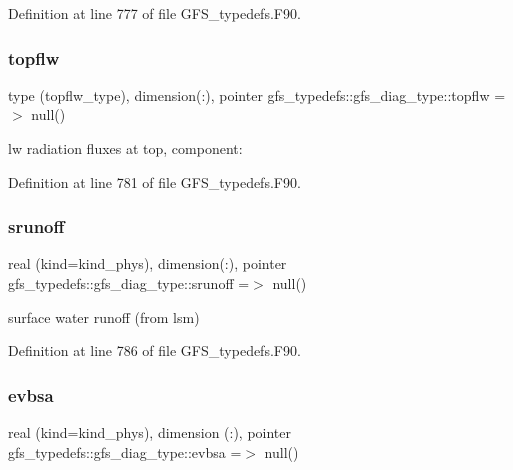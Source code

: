 Definition at line 777 of file G\+F\+S\+\_\+typedefs.\+F90.

\mbox{\label{structgfs__typedefs_1_1gfs__diag__type_aa59615824e9e84be82dbf70507f517b8}} 
\subsubsection{topflw}
{\footnotesize\ttfamily type (topflw\+\_\+type), dimension(\+:), pointer gfs\+\_\+typedefs\+::gfs\+\_\+diag\+\_\+type\+::topflw =$>$ null()}



lw radiation fluxes at top, component\+: 



Definition at line 781 of file G\+F\+S\+\_\+typedefs.\+F90.

\mbox{\label{structgfs__typedefs_1_1gfs__diag__type_a781786fecd0390b3c69b56285eade4fc}} 
\subsubsection{srunoff}
{\footnotesize\ttfamily real (kind=kind\+\_\+phys), dimension(\+:), pointer gfs\+\_\+typedefs\+::gfs\+\_\+diag\+\_\+type\+::srunoff =$>$ null()}



surface water runoff (from lsm) 



Definition at line 786 of file G\+F\+S\+\_\+typedefs.\+F90.

\mbox{\label{structgfs__typedefs_1_1gfs__diag__type_a8252b50f5e427ba6899c3d72d55586ea}} 
\subsubsection{evbsa}
{\footnotesize\ttfamily real (kind=kind\+\_\+phys), dimension  (\+:), pointer gfs\+\_\+typedefs\+::gfs\+\_\+diag\+\_\+type\+::evbsa =$>$ null()}



